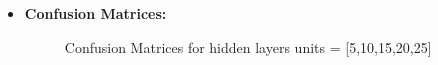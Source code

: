 \documentclass[a4 paper]{article}
\begin{document}
\begin{itemize}
\item \textbf{Confusion Matrices:}
\begin{figure}[H]
    \centering
    \qquad
  	\hspace*{-1.5cm}
    \caption{Confusion Matrices for hidden layers units = [5,10,15,20,25]}%
    \label{fig:example}%
\end{figure}
\end{itemize}
\end{document}
